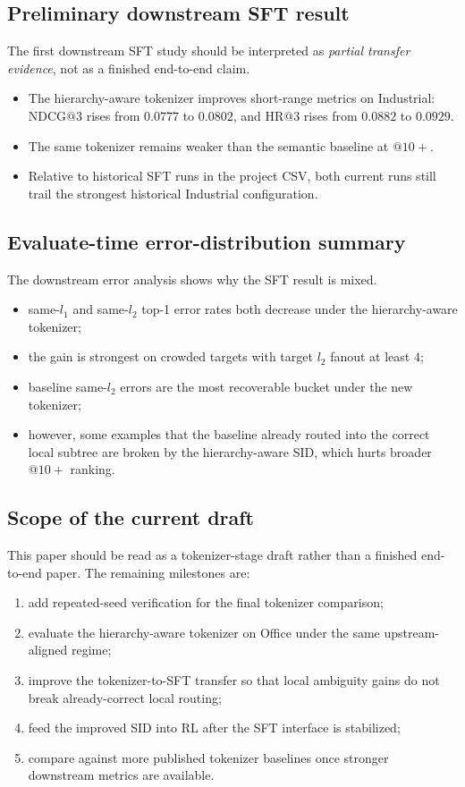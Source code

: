 \subsection{Preliminary downstream SFT result}

The first downstream SFT study should be interpreted as \emph{partial transfer evidence}, not as a finished end-to-end claim.
\begin{itemize}[leftmargin=1.4em]
  \item The hierarchy-aware tokenizer improves short-range metrics on Industrial: $\mathrm{NDCG}@3$ rises from $0.0777$ to $0.0802$, and $\mathrm{HR}@3$ rises from $0.0882$ to $0.0929$.
  \item The same tokenizer remains weaker than the semantic baseline at $@10+$.
  \item Relative to historical SFT runs in the project CSV, both current runs still trail the strongest historical Industrial configuration.
\end{itemize}

\subsection{Evaluate-time error-distribution summary}

The downstream error analysis shows why the SFT result is mixed.
\begin{itemize}[leftmargin=1.4em]
  \item same-$l_1$ and same-$l_2$ top-1 error rates both decrease under the hierarchy-aware tokenizer;
  \item the gain is strongest on crowded targets with target $l_2$ fanout at least $4$;
  \item baseline same-$l_2$ errors are the most recoverable bucket under the new tokenizer;
  \item however, some examples that the baseline already routed into the correct local subtree are broken by the hierarchy-aware SID, which hurts broader $@10+$ ranking.
\end{itemize}

\subsection{Scope of the current draft}

This paper should be read as a tokenizer-stage draft rather than a finished end-to-end paper. The remaining milestones are:
\begin{enumerate}[leftmargin=1.4em]
  \item add repeated-seed verification for the final tokenizer comparison;
  \item evaluate the hierarchy-aware tokenizer on Office under the same upstream-aligned regime;
  \item improve the tokenizer-to-SFT transfer so that local ambiguity gains do not break already-correct local routing;
  \item feed the improved SID into RL after the SFT interface is stabilized;
  \item compare against more published tokenizer baselines once stronger downstream metrics are available.
\end{enumerate}
